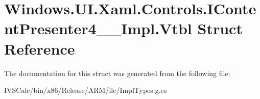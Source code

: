 \hypertarget{struct_windows_1_1_u_i_1_1_xaml_1_1_controls_1_1_i_content_presenter4_____impl_1_1_vtbl}{}\section{Windows.\+U\+I.\+Xaml.\+Controls.\+I\+Content\+Presenter4\+\_\+\+\_\+\+Impl.\+Vtbl Struct Reference}
\label{struct_windows_1_1_u_i_1_1_xaml_1_1_controls_1_1_i_content_presenter4_____impl_1_1_vtbl}


The documentation for this struct was generated from the following file\+:\begin{DoxyCompactItemize}
\item 
I\+V\+S\+Calc/bin/x86/\+Release/\+A\+R\+M/ilc/Impl\+Types.\+g.\+cs\end{DoxyCompactItemize}
